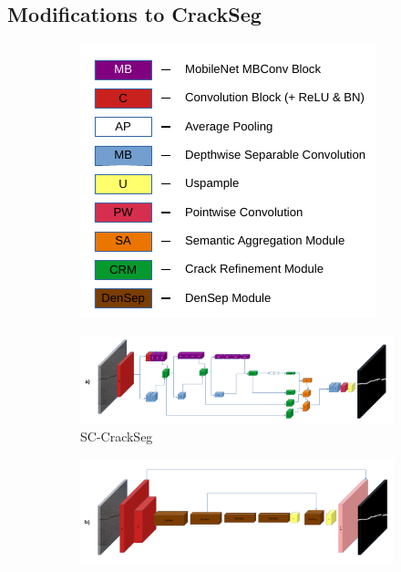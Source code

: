 \documentclass[a4paper,12pt]{report}
\begin{document}
\subsection{Modifications to CrackSeg}

\begin{figure}[]
    \centering
    \begin{subfigure}[b]{0.3\textwidth}
        \centering
        \includegraphics[width=\textwidth]{res/crack-experiment-diagrams/legend.pdf}
        \label{fig:sc-crackseg-versions-legend}
    \end{subfigure}
    \begin{subfigure}[b]{0.6964\textwidth}
        \centering
        \includegraphics[width=\textwidth]{res/crack-experiment-diagrams/sc-crackseg.pdf}
        \caption{SC-CrackSeg}
        \label{fig:sc-crackseg-versions-sc-crackseg}
    \end{subfigure}
    \begin{subfigure}[b]{0.6964\textwidth}
        \centering
        \includegraphics[width=\textwidth]{res/crack-experiment-diagrams/sddnet.pdf}

\end{subfigure}
\end{figure}
\end{document}

